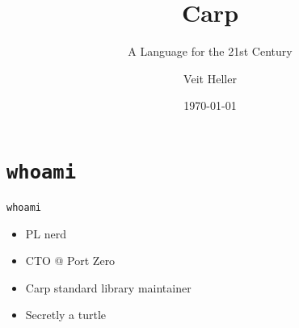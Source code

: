 \documentclass[aspectratio=169]{beamer}
\title{Carp}
\subtitle{A Language for the 21st Century}
\date{\today}
\author{Veit Heller}
\institute{Port Zero}
\begin{document}
  \maketitle
  \section{\texttt{whoami}}
  \begin{frame}{\texttt{whoami}}
    \begin{itemize}
      \item PL nerd
      \item CTO @ Port Zero
      \item Carp standard library maintainer
      \item Secretly a turtle
    \end{itemize}
  \end{frame}
\end{document}
